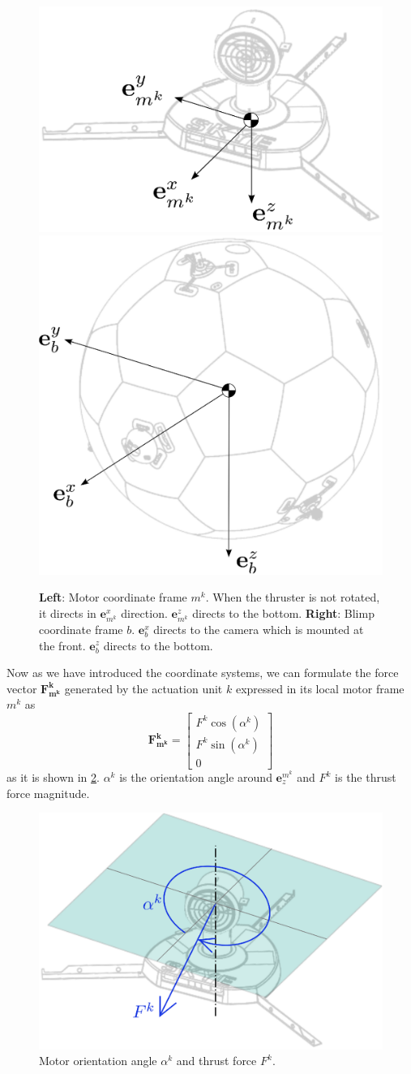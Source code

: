 \begin{figure}[hbtp]
\centering
\includegraphics[width=.4\linewidth]{images/motor_frame.eps}
\includegraphics[width=.4\linewidth]{images/blimp_frame.eps}
\caption{\textbf{Left}: Motor coordinate frame $m^k$. When the thruster is not rotated, it directs in $\mathbf{e}^x_{m^k}$ direction. $\mathbf{e}^z_{m^k}$ directs to the bottom.
\textbf{Right}: Blimp coordinate frame $b$. $\mathbf{e}^x_{b}$ directs to the camera which is mounted at the front. 
$\mathbf{e}^z_{b}$ directs to the bottom.}
\label{fig:frames}
\end{figure}

Now as we have introduced the coordinate systems, we can formulate the force vector $\mathbf{F_{m^k}^k}$ generated by the actuation unit $k$ expressed in its local motor frame $m^k$ as
\begin{equation}
\mathbf{F_{m^k}^k} = 
\left[\begin{array}{c}
F^k \cos(\alpha^k) \\
F^k \sin(\alpha^k) \\
0
\end{array}\right]
\end{equation}
as it is shown in \cref{fig:motor_force}.
$\alpha^k$ is the orientation angle around $\mathbf{e}^{m^k}_z$ and $F^k$ is the thrust force magnitude.

\begin{figure}[hbtp]
\centering
\includegraphics[width=.4\linewidth]{images/motor_force.eps}
\caption{Motor orientation angle $\alpha^k$ and thrust force $F^k$.}
\label{fig:motor_force}
\end{figure}

